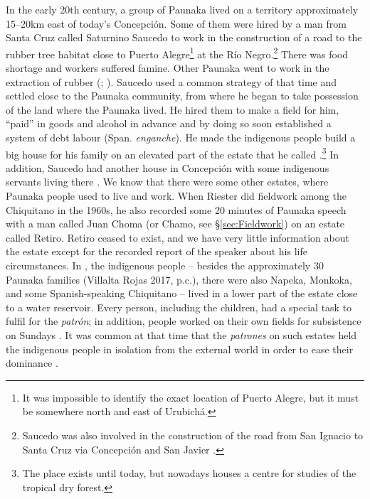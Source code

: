 In the early 20th century, a group of Paunaka lived on a territory approximately 15–20km east of today's Concepción. Some of them were hired by a man from Santa Cruz called Saturnino Saucedo to work in the construction of a road to the rubber tree habitat close to Puerto Alegre\footnote{It was impossible to identify the exact location of Puerto Alegre, but it must be somewhere north and east of Urubichá.} at the Río Negro.\footnote{Saucedo was also involved in the construction of the road from San Ignacio to Santa Cruz via Concepción and San Javier \citep[235]{Tonelli2004}.} There was food shortage and workers suffered famine. Other Paunaka went to work in the extraction of rubber (\citealt[11--12]{Villalta2012}; \citealt[1]{Villalta2013}). Saucedo used a common strategy of that time \citep[cf.][58]{APCOB_Saberes} and settled close to the Paunaka community, from where he began to take possession of the land where the Paunaka lived. He hired them to make a field for him, “paid” in goods and alcohol in advance and by doing so soon established a system of debt labour (Span. \textit{enganche}). He made the indigenous people build a big house for his family on an elevated part of the estate that he called .\footnote{The place exists until today, but nowadays houses a centre for studies of the tropical dry forest.} In addition, Saucedo had another house in Concepción with some indigenous servants living there \citep[2]{Villalta2013}.
We know that there were some other estates, where Paunaka people used to live and work. When Riester did fieldwork among the Chiquitano in the 1960s, he also recorded some 20 minutes of Paunaka speech with a man called Juan Choma (or Chamo, see §\ref{sec:Fieldwork}) on an estate called Retiro. Retiro ceased to exist, and we have very little information about the estate except for the recorded report of the speaker about his life circumstances.
In , the indigenous people –  besides the approximately 30 Paunaka families (Villalta Rojas 2017, p.c.), there were also Napeka, Monkoka, and some Spanish-speaking Chiquitano – lived in a lower part of the estate close to a water reservoir. Every person, including the children, had a special task to fulfil for the \textit{patrón}; in addition, people worked on their own fields for subsistence on Sundays \citep[2]{Villalta2013}.
It was common at that time that the \textit{patrones} on such estates held the indigenous people in isolation from the external world in order to ease their dominance \citep[260]{Tonelli2004}.

